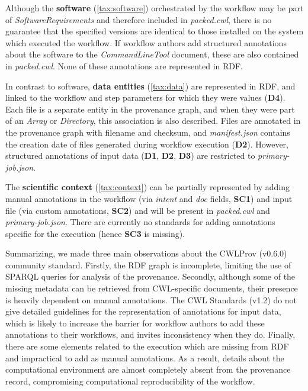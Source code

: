 Although the \textbf{software} (\ref{tax:software}) orchestrated by the workflow may be part of \emph{SoftwareRequirements} and therefore included in \emph{packed.cwl}, there is no guarantee that the specified versions are identical to those installed on the system which executed the workflow. If workflow authors add structured annotations about the software to the \emph{CommandLineTool} document, these are also contained in \emph{packed.cwl}. None of these annotations are represented in RDF.

In contrast to software, \textbf{data entities} (\ref{tax:data}) are represented in RDF, and linked to the workflow and step parameters for which they were values (\textbf{D4}). Each file is a separate entity in the provenance graph, and when they were part of an \emph{Array} or \emph{Directory}, this association is also described. Files are annotated in the provenance graph with filename and checksum, and \emph{manifest.json} contains the creation date of files generated during workflow execution (\textbf{D2}). However, structured annotations of input data (\textbf{D1}, \textbf{D2}, \textbf{D3}) are restricted to \emph{primary-job.json}.

The \textbf{scientific context} (\ref{tax:context}) can be partially represented by adding manual annotations in the workflow (via \emph{intent} and \emph{doc} fields, \textbf{SC1}) and input file (via custom annotations, \textbf{SC2}) and will be present in \emph{packed.cwl} and \emph{primary-job.json}. There are currently no standards for adding annotations specific for the execution (hence \textbf{SC3} is missing). 

Summarizing, we made three main observations about the CWLProv (v0.6.0) community standard. Firstly, the RDF graph is incomplete, limiting the use of SPARQL queries for analysis of the provenance. Secondly, although some of the missing metadata can be retrieved from CWL-specific documents, their presence is heavily dependent on manual annotations. The CWL Standards (v1.2) do not give detailed guidelines for the representation of annotations for input data, which is likely to increase the barrier for workflow authors to add these annotations to their workflows, and invites inconsistency when they do. Finally, there are some elements related to the execution which are missing from RDF and impractical to add as manual annotations. As a result, details about the computational environment are almost completely absent from the provenance record, compromising computational reproducibility of the workflow. 